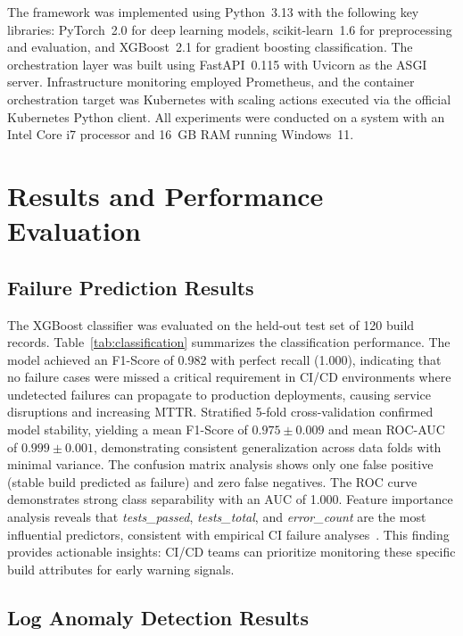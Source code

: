 \documentclass[a4paper,fleqn]{cas-dc}
\begin{document}
The framework was implemented using Python~3.13 with the following key libraries: PyTorch~2.0 for deep learning models, scikit-learn~1.6 for preprocessing and evaluation, and XGBoost~2.1 for gradient boosting classification.
The orchestration layer was built using FastAPI~0.115 with Uvicorn as the ASGI server.
Infrastructure monitoring employed Prometheus, and the container orchestration target was Kubernetes with scaling actions executed via the official Kubernetes Python client.
All experiments were conducted on a system with an Intel Core i7 processor and 16~GB RAM running Windows~11.

\section{Results and Performance Evaluation}\label{sec:results}

\subsection{Failure Prediction Results}\label{subsec:failureresults}

The XGBoost classifier was evaluated on the held-out test set of 120 build records.
Table~\ref{tab:classification} summarizes the classification performance. The model achieved an F1-Score of 0.982 with perfect recall (1.000), indicating that no failure cases were missed a critical requirement in CI/CD environments where undetected failures can propagate to production deployments, causing service disruptions and increasing MTTR.
Stratified 5-fold cross-validation confirmed model stability, yielding a mean F1-Score of $0.975 \pm 0.009$ and mean ROC-AUC of $0.999 \pm 0.001$, demonstrating consistent generalization across data folds with minimal variance.
The confusion matrix analysis shows only one false positive (stable build predicted as failure) and zero false negatives.
The ROC curve demonstrates strong class separability with an AUC of 1.000.
Feature importance analysis reveals that \textit{tests\_passed}, \textit{tests\_total}, and \textit{error\_count} are the most influential predictors, consistent with empirical CI failure analyses~\citep{rausch2017empirical}.
This finding provides actionable insights: CI/CD teams can prioritize monitoring these specific build attributes for early warning signals.

\subsection{Log Anomaly Detection Results}\label{subsec:anomalyresults}
\end{document}
